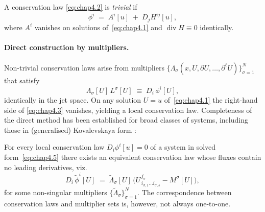 \documentclass[alpha-refs, 12pt]{wiley-article}
\begin{document}
A conservation law \eqref{eq:chap4.2} is \emph{trivial} if
\[
  \phi^{i}\;=\;A^{i}[u]\;+\;D_{j}H^{ij}[u],
\]
where $A^{i}$ vanishes on solutions of~\eqref{eq:chap4.1} and $\operatorname{div}H \equiv 0$ identically.

\paragraph{Direct construction by multipliers.} Non-trivial conservation laws arise from multipliers
$\{\Lambda_{\sigma}(x,U,\partial U,\dots,\partial^{\ell}U)\}_{\sigma=1}^{N}$ that satisfy
\begin{equation}\label{eq:chap4.3}
  \Lambda_{\sigma}[U]\,L^{\sigma}[U]
  \;\equiv\;
  D_{i}\,\phi^{i}[U],
\end{equation}
identically in the jet space. On any solution $U=u$ of~\eqref{eq:chap4.1} the right-hand side of \eqref{eq:chap4.3} vanishes, yielding a local conservation law. Completeness of the direct method has been established for broad classes of systems, including those in (generalised) Kovalevskaya form \cite{Olver1993}:
\begin{theorem}\label{thm:char_form}
  For every local conservation law $D_{i}\phi^{i}[u]=0$ of a system in solved form~\eqref{eq:chap4.5} there exists an equivalent conservation law whose fluxes contain no leading derivatives, viz.
  \[
      D_{i}\,\tilde{\phi}^{i}[U]
      \;=\;
      \widetilde{\Lambda}_{\sigma}[U]\,
      \bigl(
          U^{\,j_{\sigma}}_{\,i_{\sigma,1}\dots i_{\sigma,s}}
          -M^{\sigma}[U]
      \bigr),
  \]
  for some non-singular multipliers $\{\widetilde{\Lambda}_{\sigma}\}_{\sigma=1}^{N}$. The correspondence between conservation laws and multiplier sets is, however, not always one-to-one.
\end{theorem}
\end{document}
